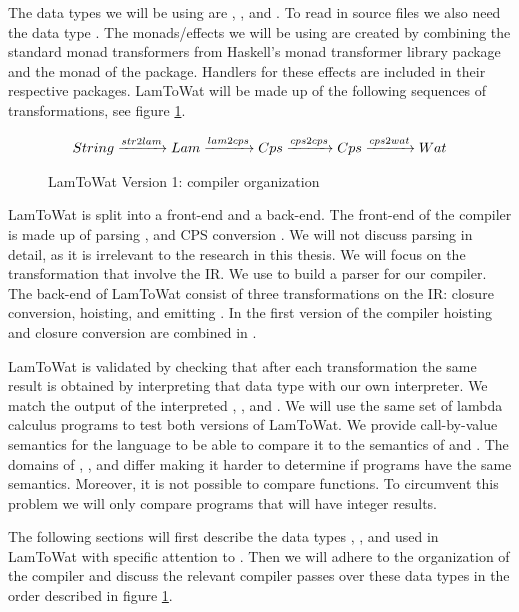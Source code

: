 The data types we will be using are , , and . To read in source files we also need the data type . The monads/effects we will be using are created by combining the standard monad transformers from Haskell's monad transformer library package  and the  monad of the  package. Handlers for these effects are included in their respective packages. LamToWat will be made up of the following sequences of transformations, see figure \ref{fig:lam2watv1org}.

\begin{figure}
\begin{gather*}
  String \xrightarrow{str2lam} Lam \xrightarrow{lam2cps} Cps \xrightarrow{cps2cps} Cps \xrightarrow{cps2wat} Wat
\end{gather*}
\caption{LamToWat Version 1: compiler organization}
\label{fig:lam2watv1org}
\end{figure}

LamToWat is split into a front-end and a back-end. The front-end of the compiler is made up of parsing , and CPS conversion . We will not discuss  parsing in detail, as it is irrelevant to the research in this thesis. We will focus on the transformation that involve the IR. We use  to build a parser for our compiler. The back-end of LamToWat consist of three transformations on the IR: closure conversion, hoisting, and emitting . In the first version of the compiler hoisting and closure conversion are combined in .

LamToWat is validated by checking that after each transformation the same result is obtained by interpreting that data type with our own interpreter. We match the output of the interpreted , , and . We will use the same set of lambda calculus programs to test both versions of LamToWat. We provide call-by-value semantics for the  language to be able to compare it to the semantics of  and . The domains of , , and  differ making it harder to determine if programs have the same semantics. Moreover, it is not possible to compare functions. To circumvent this problem we will only compare programs that will have integer results.

The following sections will first describe the data types , , and  used in LamToWat with specific attention to . Then we will adhere to the organization of the compiler and discuss the relevant compiler passes over these data types in the order described in figure \ref{fig:lam2watv1org}.

